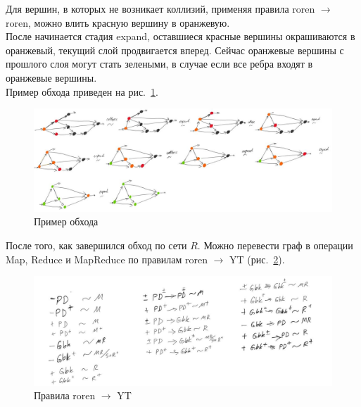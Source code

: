 \begin{algo}
Для вершин, в которых не возникает коллизий, применяя правила roren $\xrightarrow{}$ roren, можно влить красную вершину в оранжевую.\\
После начинается стадия expand, оставшиеся красные вершины окрашиваются в оранжевый, текущий слой продвигается вперед. Сейчас оранжевые вершины с прошлого слоя могут стать зелеными, в случае если все ребра входят в оранжевые вершины.\\
Пример обхода приведен на рис.~\ref{fig:algo}.\\
\begin{figure}[h]
    \centering
    \includegraphics[width=\textwidth]{img/algo.jpeg}
    \caption{Пример обхода}
    \label{fig:algo}
\end{figure}

После того, как завершился обход по сети $R$. Можно перевести граф в операции Map, Reduce и MapReduce по правилам roren $\xrightarrow{}$ YT (рис.~\ref{fig:rule2}).\\
\end{algo}

\begin{figure}[h]
    \centering
    \includegraphics[width=\textwidth]{img/rule2.jpeg}
    \caption{Правила roren $\xrightarrow{}$ YT}
    \label{fig:rule2}
\end{figure}

